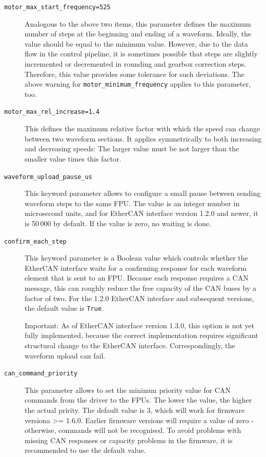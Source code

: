 \documentclass[11pt,a4paper]{scrartcl}
\begin{document}
\begin{description}
\item[\texttt{motor\_max\_start\_frequency=525}] Analogous to the
  above two items, this parameter defines the maximum number of steps
  at the beginning and ending of a waveform.  Ideally, the value
  should be equal to the minimum value. However, due to the data flow
  in the control pipeline, it is sometimes possible that steps are
  slightly incremented or decremented in rounding and gearbox
  correction steps. Therefore, this value provides some tolerance for
  such deviations. The above warning for
  \texttt{motor\_minimum\_frequency} applies to this parameter, too.
  
\item[\texttt{motor\_max\_rel\_increase=1.4}] This defines the maximum
  relative factor with which the speed can change between two waveform
  sections. It applies symmetrically to both increasing and decreasing
  speeds: The larger value must be not larger than the smaller value
  times this factor.
  
\label{it:waveform_upload_pause_ms}
\item[\texttt{waveform\_upload\_pause\_us}] This keyword parameter
  allows to configure a small pause between sending waveform steps to
  the same FPU. The value is an integer number in microsecond units,
  and for EtherCAN interface version 1.2.0 and newer, it is 50\,000 by default. If
  the value is zero, no waiting is done.

\label{it:confirm_each_step}  
\item[\texttt{confirm\_each\_step}] This keyword parameter is a
  Boolean value which controls whether the EtherCAN interface waits for a
  confirming response for each waveform element that is sent to an
  FPU. Because each response requires a CAN message, this can roughly
  reduce the free capacity of the CAN buses by a factor of two. For the
  1.2.0 EtherCAN interface and subsequent versions, the default value is \texttt{True}.

  Important: As of EtherCAN interface version 1.3.0, this option is not yet fully
  implemented, because the correct implementation requires significant
  structural change to the EtherCAN interface. Correspondingly, the waveform
  upload can fail.

  \label{it:ratelimits}  

\item[\texttt{can\_command\_priority}] This parameter allows to set
  the minimun priority value for CAN commands from the driver to the
  FPUs. The lower the value, the higher the actual pririty.  The
  default value is 3, which will work for firmware versiona >= 1.6.0.
  Earlier firmware versions will require a value of zero - otherwise,
  commands will not be recognised. To avoid problems with missing CAN
  responses or capacity problems in the firmware, it is recommended to
  use the default value.
  

\end{description}
\end{document}

